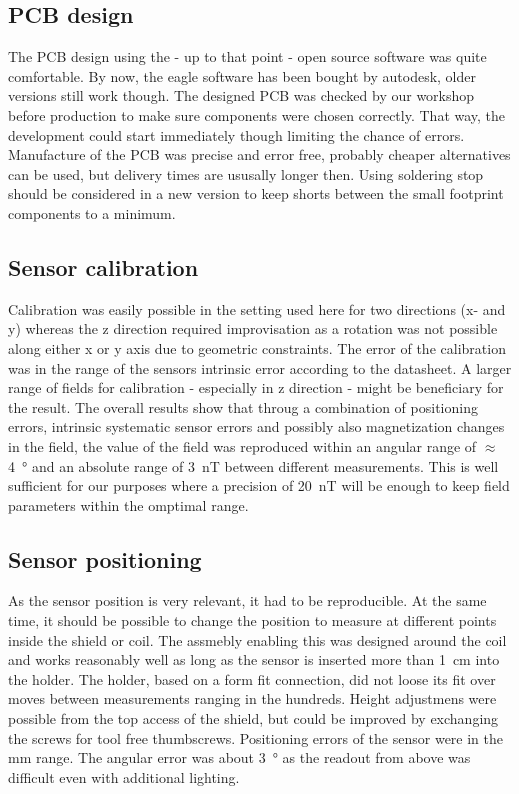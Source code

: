         \subsection{PCB design}
            The PCB design using the - up to that point - open source software was quite comfortable. By now, the eagle software has been bought by autodesk, older versions still work though. The designed PCB was checked by our workshop before production to make sure components were chosen correctly. That way, the development could start immediately though limiting the chance of errors. Manufacture of the PCB was precise and error free, probably cheaper alternatives can be used, but delivery times are ususally longer then. Using soldering stop should be considered in a new version to keep shorts between the small footprint components to a minimum.
        \subsection{Sensor calibration}
            Calibration was easily possible in the setting used here for two directions (x- and y) whereas the z direction required improvisation as a rotation was not possible along either x or y axis due to geometric constraints. The error of the calibration was in the range of the sensors intrinsic error according to the datasheet. A larger range of fields for calibration - especially in z direction - might be beneficiary for the result.
            The overall results show that throug a combination of positioning errors, intrinsic systematic sensor errors and possibly also magnetization changes in the field, the value of the field was reproduced within an angular range of $\approx$ \SI{4}{\degree} and an absolute range of \SI{3}{\nano\tesla} between different measurements. This is well sufficient for our purposes where a precision of \SI{20}{\nano\tesla} will be enough to keep field parameters within the omptimal range.
        \subsection{Sensor positioning}
            As the sensor position is very relevant, it had to be reproducible. At the same time, it should be possible to change the position to measure at different points inside the shield or coil. The assmebly enabling this was designed around the coil and works reasonably well as long as the sensor is inserted more than \SI{1}{\centi\meter} into the holder. The holder, based on a form fit connection, did not loose its fit over moves between measurements ranging in the hundreds. Height adjustmens were possible from the top access of the shield, but could be improved by exchanging the screws for tool free thumbscrews. Positioning errors of the sensor were in the \si{\milli\meter} range. The angular error was about \SI{3}{\degree} as the readout from above was difficult even with additional lighting.

